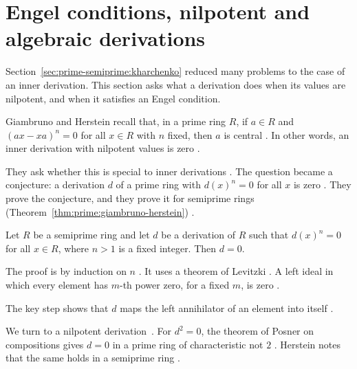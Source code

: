 \section{Engel conditions, nilpotent and algebraic derivations}\label{sec:prime-semiprime:engel-nilpotent}

Section~\ref{sec:prime-semiprime:kharchenko} reduced many problems to the case
of an inner derivation. This section asks what a derivation does when its
values are nilpotent, and when it satisfies an Engel condition.

Giambruno and Herstein recall that, in a prime ring $R$, if $a\in R$ and
$(ax-xa)^n=0$ for all $x\in R$ with $n$ fixed, then $a$ is central
\cite[p.~199]{GiambrunoHerstein1981}. In other words, an inner derivation with
nilpotent values is zero \cite[p.~199]{GiambrunoHerstein1981}.

They ask whether this is special to inner derivations
\cite[p.~199]{GiambrunoHerstein1981}. The question became a conjecture: a
derivation $d$ of a prime ring with $d(x)^n=0$ for all $x$ is zero
\cite[p.~199]{GiambrunoHerstein1981}. They prove the conjecture, and they
prove it for semiprime rings (Theorem~\ref{thm:prime:giambruno-herstein})
\cite[p.~199]{GiambrunoHerstein1981}.

\begin{theorem}\label{thm:prime:giambruno-herstein}
Let $R$ be a semiprime ring and let $d$ be a derivation of $R$ such that
$d(x)^n=0$ for all $x\in R$, where $n>1$ is a fixed integer. Then $d=0$.
\end{theorem}

The proof is by induction on $n$ \cite[p.~200]{GiambrunoHerstein1981}. It uses
a theorem of Levitzki \cite[p.~200]{GiambrunoHerstein1981}. A left ideal in
which every element has $m$-th power zero, for a fixed $m$, is zero
\cite[Remark~4, p.~200]{GiambrunoHerstein1981}.

The key step shows that $d$ maps the left annihilator of an element into
itself \cite[Lemma~1, p.~200]{GiambrunoHerstein1981}.

We turn to a nilpotent derivation~\cite[p.~509]{Herstein1979}. For $d^2=0$, the theorem of Posner on
compositions gives $d=0$ in a prime ring of characteristic not $2$
\cite[p.~179]{MartindaleMiers1983}. Herstein notes that the same holds in a
semiprime ring \cite[p.~509]{Herstein1979}.

